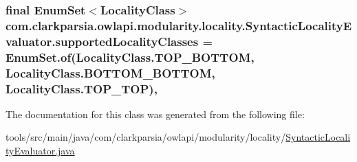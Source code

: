 \hypertarget{classcom_1_1clarkparsia_1_1owlapi_1_1modularity_1_1locality_1_1_syntactic_locality_evaluator_a07d7fdd34bac1b3a0875c51bafe93c41}{
\subsubsection[{supported\-Locality\-Classes}]{\setlength{\rightskip}{0pt plus 5cm}final Enum\-Set$<${\bf Locality\-Class}$>$ com.\-clarkparsia.\-owlapi.\-modularity.\-locality.\-Syntactic\-Locality\-Evaluator.\-supported\-Locality\-Classes = Enum\-Set.\-of({\bf Locality\-Class.\-T\-O\-P\-\_\-\-B\-O\-T\-T\-O\-M}, {\bf Locality\-Class.\-B\-O\-T\-T\-O\-M\-\_\-\-B\-O\-T\-T\-O\-M}, {\bf Locality\-Class.\-T\-O\-P\-\_\-\-T\-O\-P})\hspace{0.3cm}{\ttfamily [static]}, {\ttfamily [private]}}}\label{classcom_1_1clarkparsia_1_1owlapi_1_1modularity_1_1locality_1_1_syntactic_locality_evaluator_a07d7fdd34bac1b3a0875c51bafe93c41}


The documentation for this class was generated from the following file\-:\begin{DoxyCompactItemize}
\item 
tools/src/main/java/com/clarkparsia/owlapi/modularity/locality/\hyperlink{_syntactic_locality_evaluator_8java}{Syntactic\-Locality\-Evaluator.\-java}\end{DoxyCompactItemize}
